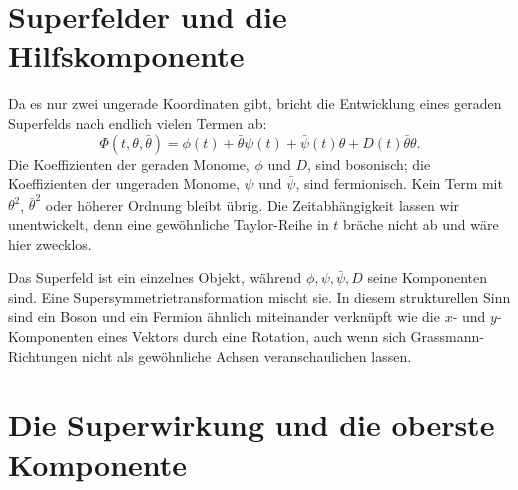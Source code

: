 \section{Superfelder und die Hilfskomponente}

Da es nur zwei ungerade Koordinaten gibt, bricht die Entwicklung eines geraden Superfelds nach endlich vielen Termen ab:
\begin{equation}
\Phi(t,\theta,\bar\theta)
=\phi(t)+\bar\theta\psi(t)+\bar\psi(t)\theta
+D(t)\bar\theta\theta.
\label{eq:l7-superfield}
\end{equation}
Die Koeffizienten der geraden Monome, \(\phi\) und \(D\), sind bosonisch; die Koeffizienten der ungeraden Monome, \(\psi\) und \(\bar\psi\), sind fermionisch. Kein Term mit \(\theta^2\), \(\bar\theta^2\) oder höherer Ordnung bleibt übrig. Die Zeitabhängigkeit lassen wir unentwickelt, denn eine gewöhnliche Taylor-Reihe in \(t\) bräche nicht ab und wäre hier zwecklos.

\begin{classroomqa}
\end{classroomqa}

Das Superfeld ist ein einzelnes Objekt, während \(\phi,\psi,\bar\psi,D\) seine Komponenten sind. Eine Supersymmetrietransformation mischt sie. In diesem strukturellen Sinn sind ein Boson und ein Fermion ähnlich miteinander verknüpft wie die \(x\)- und \(y\)-Komponenten eines Vektors durch eine Rotation, auch wenn sich Grassmann-Richtungen nicht als gewöhnliche Achsen veranschaulichen lassen.

\section{Die Superwirkung und die oberste Komponente}

